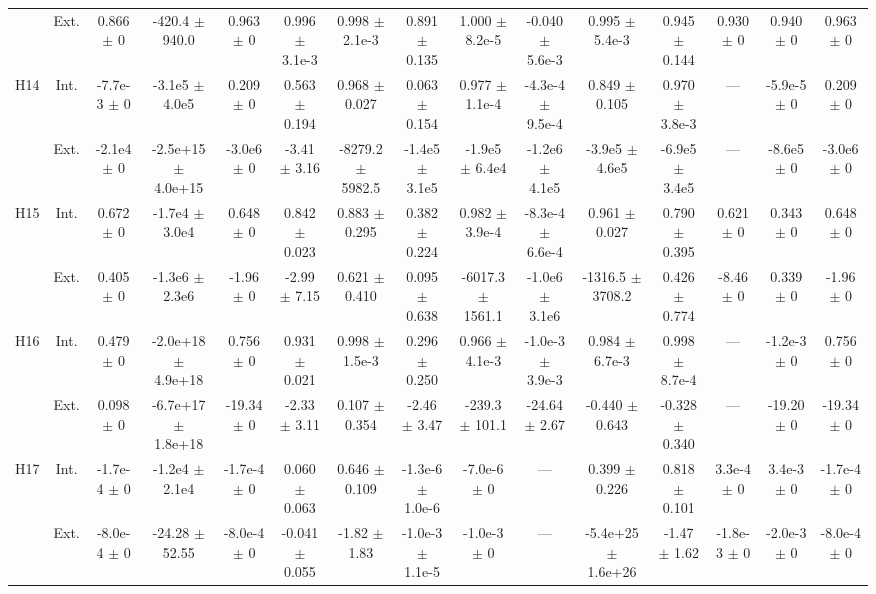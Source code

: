 \begin{table}[htbp]
{\begin{tabular}{@{}ccccccccccccccc@{}}
 & Ext. & 0.866 $\pm$ 0 & -420.4 $\pm$ 940.0 & 0.963 $\pm$ 0 & 0.996 $\pm$ 3.1e-3 & 0.998 $\pm$ 2.1e-3 & 0.891 $\pm$ 0.135 & 1.000 $\pm$ 8.2e-5 & -0.040 $\pm$ 5.6e-3 & 0.995 $\pm$ 5.4e-3 & 0.945 $\pm$ 0.144 & 0.930 $\pm$ 0 & 0.940 $\pm$ 0 & 0.963 $\pm$ 0 \\
\cline{2-15}
\multirow{2}{*}{H14} & Int. & -7.7e-3 $\pm$ 0 & -3.1e5 $\pm$ 4.0e5 & 0.209 $\pm$ 0 & 0.563 $\pm$ 0.194 & 0.968 $\pm$ 0.027 & 0.063 $\pm$ 0.154 & 0.977 $\pm$ 1.1e-4 & -4.3e-4 $\pm$ 9.5e-4 & 0.849 $\pm$ 0.105 & 0.970 $\pm$ 3.8e-3 & --- & -5.9e-5 $\pm$ 0 & 0.209 $\pm$ 0 \\
 & Ext. & -2.1e4 $\pm$ 0 & -2.5e+15 $\pm$ 4.0e+15 & -3.0e6 $\pm$ 0 & -3.41 $\pm$ 3.16 & -8279.2 $\pm$ 5982.5 & -1.4e5 $\pm$ 3.1e5 & -1.9e5 $\pm$ 6.4e4 & -1.2e6 $\pm$ 4.1e5 & -3.9e5 $\pm$ 4.6e5 & -6.9e5 $\pm$ 3.4e5 & --- & -8.6e5 $\pm$ 0 & -3.0e6 $\pm$ 0 \\
\cline{2-15}
\multirow{2}{*}{H15} & Int. & 0.672 $\pm$ 0 & -1.7e4 $\pm$ 3.0e4 & 0.648 $\pm$ 0 & 0.842 $\pm$ 0.023 & 0.883 $\pm$ 0.295 & 0.382 $\pm$ 0.224 & 0.982 $\pm$ 3.9e-4 & -8.3e-4 $\pm$ 6.6e-4 & 0.961 $\pm$ 0.027 & 0.790 $\pm$ 0.395 & 0.621 $\pm$ 0 & 0.343 $\pm$ 0 & 0.648 $\pm$ 0 \\
 & Ext. & 0.405 $\pm$ 0 & -1.3e6 $\pm$ 2.3e6 & -1.96 $\pm$ 0 & -2.99 $\pm$ 7.15 & 0.621 $\pm$ 0.410 & 0.095 $\pm$ 0.638 & -6017.3 $\pm$ 1561.1 & -1.0e6 $\pm$ 3.1e6 & -1316.5 $\pm$ 3708.2 & 0.426 $\pm$ 0.774 & -8.46 $\pm$ 0 & 0.339 $\pm$ 0 & -1.96 $\pm$ 0 \\
\cline{2-15}
\multirow{2}{*}{H16} & Int. & 0.479 $\pm$ 0 & -2.0e+18 $\pm$ 4.9e+18 & 0.756 $\pm$ 0 & 0.931 $\pm$ 0.021 & 0.998 $\pm$ 1.5e-3 & 0.296 $\pm$ 0.250 & 0.966 $\pm$ 4.1e-3 & -1.0e-3 $\pm$ 3.9e-3 & 0.984 $\pm$ 6.7e-3 & 0.998 $\pm$ 8.7e-4 & --- & -1.2e-3 $\pm$ 0 & 0.756 $\pm$ 0 \\
 & Ext. & 0.098 $\pm$ 0 & -6.7e+17 $\pm$ 1.8e+18 & -19.34 $\pm$ 0 & -2.33 $\pm$ 3.11 & 0.107 $\pm$ 0.354 & -2.46 $\pm$ 3.47 & -239.3 $\pm$ 101.1 & -24.64 $\pm$ 2.67 & -0.440 $\pm$ 0.643 & -0.328 $\pm$ 0.340 & --- & -19.20 $\pm$ 0 & -19.34 $\pm$ 0 \\
\cline{2-15}
\multirow{2}{*}{H17} & Int. & -1.7e-4 $\pm$ 0 & -1.2e4 $\pm$ 2.1e4 & -1.7e-4 $\pm$ 0 & 0.060 $\pm$ 0.063 & 0.646 $\pm$ 0.109 & -1.3e-6 $\pm$ 1.0e-6 & -7.0e-6 $\pm$ 0 & --- & 0.399 $\pm$ 0.226 & 0.818 $\pm$ 0.101 & 3.3e-4 $\pm$ 0 & 3.4e-3 $\pm$ 0 & -1.7e-4 $\pm$ 0 \\
 & Ext. & -8.0e-4 $\pm$ 0 & -24.28 $\pm$ 52.55 & -8.0e-4 $\pm$ 0 & -0.041 $\pm$ 0.055 & -1.82 $\pm$ 1.83 & -1.0e-3 $\pm$ 1.1e-5 & -1.0e-3 $\pm$ 0 & --- & -5.4e+25 $\pm$ 1.6e+26 & -1.47 $\pm$ 1.62 & -1.8e-3 $\pm$ 0 & -2.0e-3 $\pm$ 0 & -8.0e-4 $\pm$ 0 \\

\end{tabular}}
\end{table}
